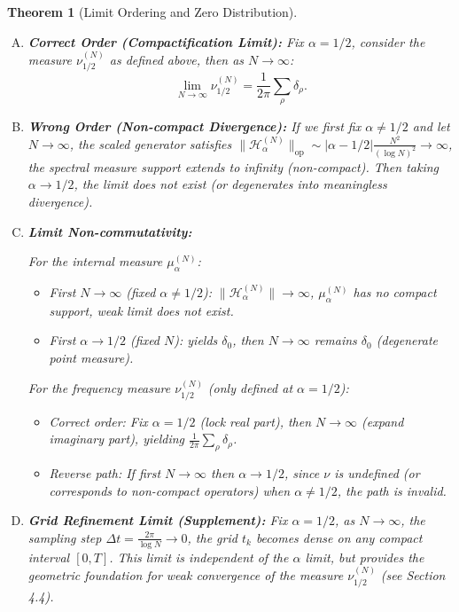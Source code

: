 \documentclass[12pt,a4paper]{amsart}
\theoremstyle{plain}
\newtheorem{theorem}{Theorem}[section]
\theoremstyle{definition}
\theoremstyle{remark}
\begin{document}
\begin{theorem}[Limit Ordering and Zero Distribution]\label{thm:limit_order}

\begin{enumerate}[(A)]
    \item \textbf{Correct Order (Compactification Limit):}
    Fix $\alpha=1/2$, consider the measure $\nu_{1/2}^{(N)}$ as defined above, then as $N\to\infty$:
    \begin{equation}
    \lim_{N\to\infty} \nu_{1/2}^{(N)} = \frac{1}{2\pi}\sum_{\rho} \delta_{\rho}.
    \end{equation}
    
    \item \textbf{Wrong Order (Non-compact Divergence):}
    If we first fix $\alpha \neq 1/2$ and let $N\to\infty$, the scaled generator satisfies $\|\mathcal{H}_{\alpha}^{(N)}\|_{\mathrm{op}} \sim |\alpha-1/2|\frac{N^2}{(\log N)^2} \to \infty$, the spectral measure support extends to infinity (non-compact). Then taking $\alpha\to 1/2$, the limit does not exist (or degenerates into meaningless divergence).
    
    \item \textbf{Limit Non-commutativity:}
    
    For the internal measure $\mu_\alpha^{(N)}$:
    \begin{itemize}
        \item First $N\to\infty$ (fixed $\alpha\neq 1/2$): $\|\mathcal{H}_\alpha^{(N)}\|\to\infty$, $\mu_\alpha^{(N)}$ has no compact support, weak limit does not exist.
        \item First $\alpha\to 1/2$ (fixed $N$): yields $\delta_0$, then $N\to\infty$ remains $\delta_0$ (degenerate point measure).
    \end{itemize}
    
    For the frequency measure $\nu_{1/2}^{(N)}$ (only defined at $\alpha=1/2$):
    \begin{itemize}
        \item Correct order: Fix $\alpha=1/2$ (lock real part), then $N\to\infty$ (expand imaginary part), yielding $\frac{1}{2\pi}\sum_\rho \delta_\rho$.
        \item Reverse path: If first $N\to\infty$ then $\alpha\to 1/2$, since $\nu$ is undefined (or corresponds to non-compact operators) when $\alpha\neq 1/2$, the path is invalid.
    \end{itemize}
    
    \item \textbf{Grid Refinement Limit (Supplement):}
    Fix $\alpha=1/2$, as $N\to\infty$, the sampling step $\Delta t = \frac{2\pi}{\log N} \to 0$, the grid $t_k$ becomes dense on any compact interval $[0,T]$. This limit is independent of the $\alpha$ limit, but provides the geometric foundation for weak convergence of the measure $\nu_{1/2}^{(N)}$ (see Section 4.4).
\end{enumerate}
\end{theorem}
\end{document}
